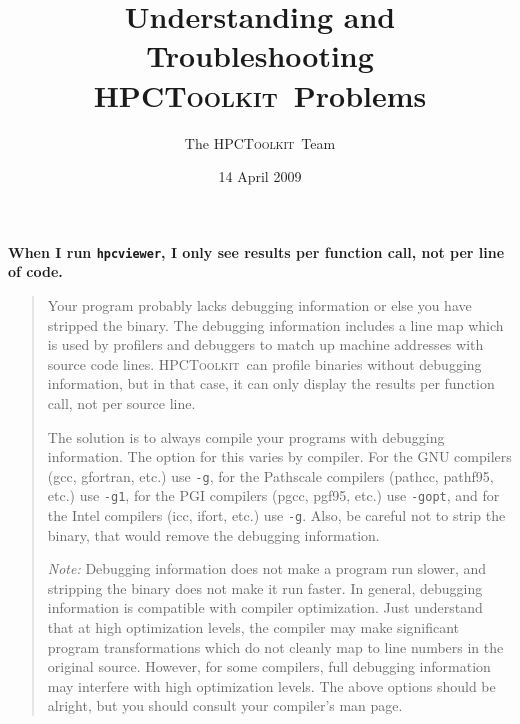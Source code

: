 \documentclass{article}
\newcommand{\hpctoolkit}{\textsc{HPCToolkit}}
\newcommand{\hpcviewer}{\texttt{hpcviewer}}
\begin{document}
\title{Understanding and Troubleshooting \\
         \hpctoolkit\ Problems}
\author{The \hpctoolkit\ Team}
\date{14 April 2009}
\maketitle


\textbf{When I run \hpcviewer, I only see results per function call,
not per line of code.}
\begin{quote}
Your program probably lacks debugging information or else you have
stripped the binary.  The debugging information includes a line map
which is used by profilers and debuggers to match up machine addresses
with source code lines.  \hpctoolkit\ can profile binaries without
debugging information, but in that case, it can only display the
results per function call, not per source line.

The solution is to always compile your programs with debugging
information.  The option for this varies by compiler.  For the GNU
compilers (gcc, gfortran, etc.) use {\tt -g}, for the Pathscale
compilers (pathcc, pathf95, etc.) use {\tt -g1}, for the PGI compilers
(pgcc, pgf95, etc.) use {\tt -gopt}, and for the Intel compilers (icc,
ifort, etc.) use {\tt -g}.  Also, be careful not to strip the binary,
that would remove the debugging information.

{\it Note:} Debugging information does not make a program run slower,
and stripping the binary does not make it run faster.  In general,
debugging information is compatible with compiler optimization.  Just
understand that at high optimization levels, the compiler may make
significant program transformations which do not cleanly map to line
numbers in the original source.  However, for some compilers, full
debugging information may interfere with high optimization levels.
The above options should be alright, but you should consult your
compiler's man page.
\end{quote}
\end{document}
